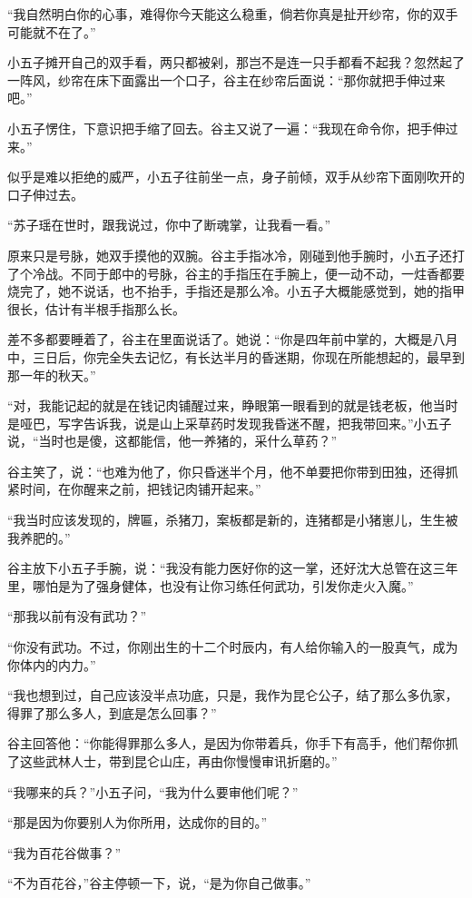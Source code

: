 “我自然明白你的心事，难得你今天能这么稳重，倘若你真是扯开纱帘，你的双手可能就不在了。”

小五子摊开自己的双手看，两只都被剁，那岂不是连一只手都看不起我？忽然起了一阵风，纱帘在床下面露出一个口子，谷主在纱帘后面说：“那你就把手伸过来
吧。”

小五子愣住，下意识把手缩了回去。谷主又说了一遍：“我现在命令你，把手伸过来。”

似乎是难以拒绝的威严，小五子往前坐一点，身子前倾，双手从纱帘下面刚吹开的口子伸过去。

“苏子瑶在世时，跟我说过，你中了断魂掌，让我看一看。”

原来只是号脉，她双手摸他的双腕。谷主手指冰冷，刚碰到他手腕时，小五子还打了个冷战。不同于郎中的号脉，谷主的手指压在手腕上，便一动不动，一炷香都要烧完了，她不说话，也不抬手，手指还是那么冷。小五子大概能感觉到，她的指甲很长，估计有半根手指那么长。

差不多都要睡着了，谷主在里面说话了。她说：“你是四年前中掌的，大概是八月中，三日后，你完全失去记忆，有长达半月的昏迷期，你现在所能想起的，最早到那一年的秋天。”

“对，我能记起的就是在钱记肉铺醒过来，睁眼第一眼看到的就是钱老板，他当时是哑巴，写字告诉我，说是山上采草药时发现我昏迷不醒，把我带回来。”小五子说，“当时也是傻，这都能信，他一养猪的，采什么草药？”

谷主笑了，说：“也难为他了，你只昏迷半个月，他不单要把你带到田独，还得抓紧时间，在你醒来之前，把钱记肉铺开起来。”

“我当时应该发现的，牌匾，杀猪刀，案板都是新的，连猪都是小猪崽儿，生生被我养肥的。”

谷主放下小五子手腕，说：“我没有能力医好你的这一掌，还好沈大总管在这三年里，哪怕是为了强身健体，也没有让你习练任何武功，引发你走火入魔。”

“那我以前有没有武功？”

“你没有武功。不过，你刚出生的十二个时辰内，有人给你输入的一股真气，成为你体内的内力。”

“我也想到过，自己应该没半点功底，只是，我作为昆仑公子，结了那么多仇家，得罪了那么多人，到底是怎么回事？”

谷主回答他：“你能得罪那么多人，是因为你带着兵，你手下有高手，他们帮你抓了这些武林人士，带到昆仑山庄，再由你慢慢审讯折磨的。”

“我哪来的兵？”小五子问，“我为什么要审他们呢？”

“那是因为你要别人为你所用，达成你的目的。”

“我为百花谷做事？”

“不为百花谷，”谷主停顿一下，说，“是为你自己做事。”

